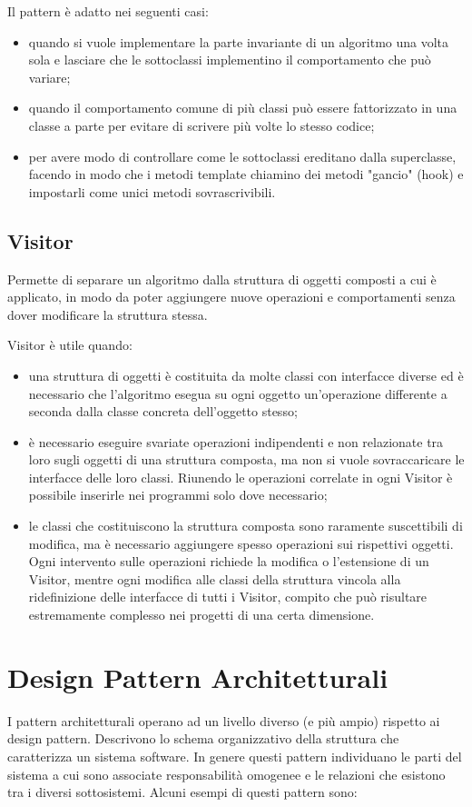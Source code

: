 Il pattern è adatto nei seguenti casi:
\begin{itemize}
\item quando si vuole implementare la parte invariante di un algoritmo una volta sola e lasciare che le sottoclassi implementino il comportamento che può variare;
\item quando il comportamento comune di più classi può essere fattorizzato in una classe a parte per evitare di scrivere più volte lo stesso codice;
\item per avere modo di controllare come le sottoclassi ereditano dalla superclasse, facendo in modo che i metodi template chiamino dei metodi "gancio" (hook) e impostarli come unici metodi sovrascrivibili.
\end{itemize}
\subsection{Visitor}
Permette di separare un algoritmo dalla struttura di oggetti composti a cui è applicato, in modo da poter aggiungere nuove operazioni e comportamenti senza dover modificare la struttura stessa.

Visitor è utile quando:
\begin{itemize}
	\item una struttura di oggetti è costituita da molte classi con interfacce diverse ed è necessario che l'algoritmo esegua su ogni oggetto un'operazione differente a seconda dalla classe concreta dell'oggetto stesso;
	\item è necessario eseguire svariate operazioni indipendenti e non relazionate tra loro sugli oggetti di una struttura composta, ma non si vuole sovraccaricare le interfacce delle loro classi. Riunendo le operazioni correlate in ogni Visitor è possibile inserirle nei programmi solo dove necessario;
	\item le classi che costituiscono la struttura composta sono raramente suscettibili di modifica, ma è necessario aggiungere spesso operazioni sui rispettivi oggetti. Ogni intervento sulle operazioni richiede la modifica o l'estensione di un Visitor, mentre ogni modifica alle classi della struttura vincola alla ridefinizione delle interfacce di tutti i Visitor, compito che può risultare estremamente complesso nei progetti di una certa dimensione.
\end{itemize}
\section{Design Pattern Architetturali}
I pattern architetturali operano ad un livello diverso (e più ampio) rispetto ai design pattern. Descrivono lo schema organizzativo della struttura che caratterizza un sistema software. In genere questi pattern individuano le parti del sistema a cui sono associate responsabilità omogenee e le relazioni che esistono tra i diversi sottosistemi.
Alcuni esempi di questi pattern sono:
